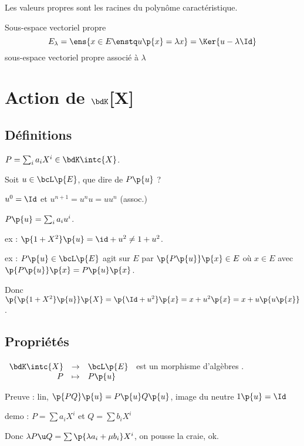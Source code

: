 \documentclass[a4paper,french,bookmarks]{book}
\begin{document}
    \begin{property}{}{}
        Les valeurs propres sont les racines du polynôme caractéristique.
    \end{property}
    
    \begin{definition}{Sous-espace vectoriel propre}{}
        \[ E_\lambda = \ens{x \in E \enstq u\p{x} = \lambda x} = \Ker{u - \lambda \Id}\]
        sous-espace vectoriel propre associé à $\lambda$
    \end{definition}
    
    \section{Action de $\bdK$[X]}
    
    \subsection{Définitions}
    
    $P = \sum_i a_iX^i \in \bdK\intc{X}$.
    
    Soit $u \in \bcL\p{E}$, que dire de $P\p{u}$ ?
    
    $u^0 = \Id$ et $u^{n+1} = u^n u = uu^n$ (assoc.)
    
    $P\p{u} = \sum_i a_iu^i$.
    
    ex : $\p{1 + X^2}\p{u} = \id + u^2 \neq 1 + u^2$.
    
    ex : $P\p{u} \in \bcL\p{E}$ agit sur $E$ par $\p{P\p{u}}\p{x} \in E$ où $x \in E$ avec $\p{P\p{u}}\p{x} = P\p{u}\p{x}$.
    
    Donc $\p{\p{1 + X^2}\p{u}}\p{X} = \p{\Id + u^2}\p{x} = x + u^2\p{x} = x + u\p{u\p{x}}$.
    
    \subsection{Propriétés}
    
    $\begin{array}[t]{rcl}
        \bdK\intc{X} &\to& \bcL\p{E}  \\
        P &\mapsto& P\p{u} 
    \end{array}$ est un morphisme d'algèbres .
    
    Preuve : lin, $\p{PQ}\p{u} = P\p{u}Q\p{u}$, image du neutre $1\p{u} = \Id$
    
    demo : $P = \sum a_iX^i$ et $Q =\sum b_iX^i$
    
    Donc $\lambda P \u Q = \sum \p{\lambda a_i + \mu b_i}X^i$, on pousse la craie, ok.
    
\end{document}
